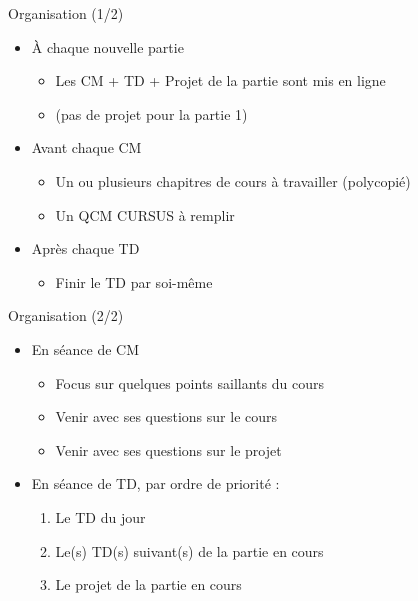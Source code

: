 \documentclass[10pt]{beamer}
\begin{document}
\begin{frame}{Organisation (1/2)}  
  \begin{itemize}
    \item À chaque nouvelle partie
    \begin{itemize}
      \item Les CM + TD + Projet de la partie sont mis en ligne
      \item (pas de projet pour la partie 1)
    \end{itemize}
    \item Avant chaque CM
    \begin{itemize}
      \item Un ou plusieurs chapitres de cours à travailler (polycopié)
      \item Un QCM CURSUS à remplir
    \end{itemize}
    \item Après chaque TD
    \begin{itemize}
      \item Finir le TD par soi-même
    \end{itemize}
  \end{itemize}
\end{frame}

\begin{frame}{Organisation (2/2)}  
  \begin{itemize}
    \item En séance de CM
    \begin{itemize}
      \item Focus sur quelques points saillants du cours
      \item Venir avec ses questions sur le cours
      \item Venir avec ses questions sur le projet
    \end{itemize}
    \item En séance de TD, par ordre de priorité :
    \begin{enumerate}
      \item Le TD du jour
      \item Le(s) TD(s) suivant(s) de la partie en cours
      \item Le projet de la partie en cours
    \end{enumerate}
  \end{itemize}
\end{frame}
\end{document}

